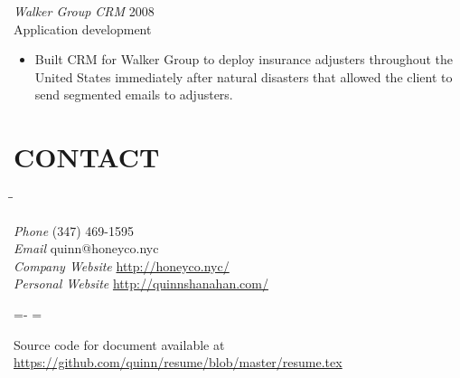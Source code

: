 \documentclass[line,margin]{res}
\begin{document}
\begin{resume}
\begin{itemize}
    \end{itemize}

    \begin{samepage}
    {\sl Walker Group CRM}
    \hfill 2008 \\
    Application development
    \begin{itemize} \itemsep -2pt
        \item
            Built CRM for Walker Group to deploy insurance adjusters
            throughout the United States immediately after natural disasters
            that allowed the client to send segmented emails to adjusters.

    \end{itemize}
    \end{samepage}

\section{CONTACT}
    \vspace{-2.3ex}
    \begin{tabbing}
    \hspace{1.5in}\= \hspace{2.0in}\= \kill

    {\sl Phone}            \> (347) 469-1595 \\
    {\sl Email}            \> quinn@honeyco.nyc \\
    {\sl Company Website}  \> \url{http://honeyco.nyc/} \\
    {\sl Personal Website} \> \url{http://quinnshanahan.com/} \\

    \end{tabbing}

\vfill
\leftskip=-\hoffset
\advance\textwidth\hoffset
\hsize=\textwidth
\fullline
\vskip 2pt

Source code for document available at
\url{https://github.com/quinn/resume/blob/master/resume.tex}

\end{resume}
\end{document}
